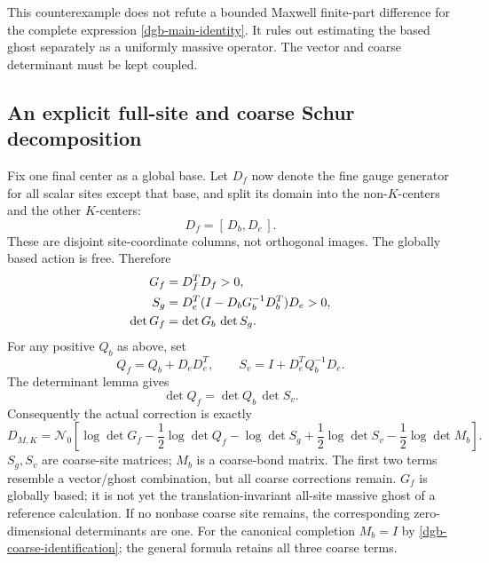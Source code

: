 This counterexample does not refute a bounded Maxwell
finite-part difference for the complete expression
\eqref{dgb-main-identity}. It rules out estimating the
based ghost separately as a uniformly massive operator.
The vector and coarse determinant must be kept coupled.

\subsection{An explicit full-site and coarse Schur decomposition}
\label{dgb-full-Schur-section}

Fix one final center as a global base. Let $D_f$ now denote
the fine gauge generator for all scalar sites except that
base, and split its domain into the non-$K$-centers and the
other $K$-centers:
\[
                            D_f=[\,D_b,D_e\,].
\]
These are disjoint site-coordinate columns, not orthogonal
images. The globally based action is free. Therefore
\begin{align}
 G_f&=D_f^TD_f>0,\notag\\
 S_g&=D_e^T(I-D_bG_b^{-1}D_b^T)D_e>0,\notag\\
 \det G_f&=\det G_b\,\det S_g .
 \label{dgb-ghost-Schur}
\end{align}
For any positive $Q_b$ as above, set
\begin{equation}
 Q_f=Q_b+D_eD_e^T,\qquad
 S_v=I+D_e^TQ_b^{-1}D_e.
 \label{dgb-vector-Schur-data}
\end{equation}
The determinant lemma gives
\begin{equation}
                         \det Q_f=\det Q_b\,\det S_v .
 \label{dgb-vector-Schur}
\end{equation}
Consequently the actual correction is exactly
\begin{equation}
 D_{M,K}=\mathcal N_0\left[
   \log\det G_f-\frac12\log\det Q_f
   -\log\det S_g+\frac12\log\det S_v
   -\frac12\log\det M_b\right].
 \label{dgb-full-decomposition}
\end{equation}
$S_g,S_v$ are coarse-site matrices; $M_b$ is a coarse-bond
matrix. The first two terms resemble a vector/ghost
combination, but all coarse corrections remain.
$G_f$ is globally based; it is not yet the translation-invariant
all-site massive ghost of a reference calculation.
If no nonbase coarse site remains, the corresponding
zero-dimensional determinants are one. For the canonical
completion $M_b=I$ by \eqref{dgb-coarse-identification};
the general formula retains all three coarse terms.

